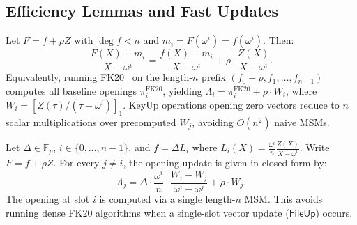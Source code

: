 \subsection{Efficiency Lemmas and Fast Updates}

\begin{lemma}
\label{lem:fk20}
Let $F = f + \rho Z$ with $\deg f < n$ and $m_i = F(\omega^i) = f(\omega^i)$. Then:
\[
\frac{F(X) - m_i}{X - \omega^i} = \frac{f(X) - m_i}{X - \omega^i} + \rho \cdot \frac{Z(X)}{X - \omega^i}.
\]
Equivalently, running FK20~\cite{FK20} on the length-$n$ prefix $(f_0 - \rho, f_1, \dots, f_{n-1})$ computes all baseline openings $\pi_i^{\mathrm{FK20}}$, yielding $\Lambda_i = \pi_i^{\mathrm{FK20}} + \rho \cdot W_i$, where $W_i = [Z(\tau)/(\tau - \omega^i)]_1$. KeyUp operations opening zero vectors reduce to $n$ scalar multiplications over precomputed $W_j$, avoiding $O(n^2)$ naive MSMs.
\end{lemma}

\begin{lemma}
\label{lem:onehot}
Let $\Delta \in \mathbb{F}_p$, $i \in \{0, \dots, n-1\}$, and $f = \Delta L_i$ where $L_i(X) = \frac{\omega^i}{n} \frac{Z(X)}{X - \omega^i}$. Write $F = f + \rho Z$. For every $j \neq i$, the opening update is given in closed form by:
\[
\Lambda_j = \Delta \cdot \frac{\omega^i}{n} \cdot \frac{W_i - W_j}{\omega^i - \omega^j} + \rho \cdot W_j.
\]
The opening at slot $i$ is computed via a single length-$n$ MSM. This avoids running dense FK20 algorithms when a single-slot vector update ($\mathsf{FileUp}$) occurs.
\end{lemma}
